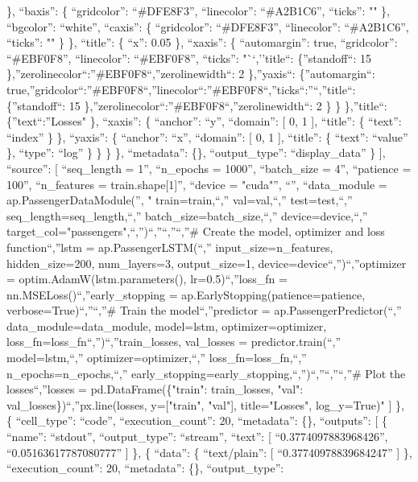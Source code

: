 \documentclass[
]{article}
\begin{document}
\}, ``baxis'': \{ ``gridcolor'': ``\#DFE8F3'', ``linecolor'':
``\#A2B1C6'', ``ticks'': "" \}, ``bgcolor'': ``white'', ``caxis'': \{
``gridcolor'': ``\#DFE8F3'', ``linecolor'': ``\#A2B1C6'', ``ticks'': ""
\} \}, ``title'': \{ ``x'': 0.05 \}, ``xaxis'': \{ ``automargin'': true,
``gridcolor'': ``\#EBF0F8'', ``linecolor'': ``\#EBF0F8'', ``ticks'':
"``,''title``: \{''standoff``: 15
\},''zerolinecolor``:''\#EBF0F8``,''zerolinewidth``: 2 \},''yaxis``:
\{''automargin``:
true,''gridcolor``:''\#EBF0F8``,''linecolor``:''\#EBF0F8``,''ticks``:''``,''title``:
\{''standoff``: 15 \},''zerolinecolor``:''\#EBF0F8``,''zerolinewidth``:
2 \} \} \},''title``: \{''text``:''Losses" \}, ``xaxis'': \{ ``anchor'':
``y'', ``domain'': {[} 0, 1 {]}, ``title'': \{ ``text'': ``index'' \}
\}, ``yaxis'': \{ ``anchor'': ``x'', ``domain'': {[} 0, 1 {]},
``title'': \{ ``text'': ``value'' \}, ``type'': ``log'' \} \} \} \},
``metadata'': \{\}, ``output\_type'': ``display\_data'' \} {]},
``source'': {[} ``seq\_length = 1\n'', ``n\_epochs = 1000\n'',
``batch\_size = 4\n'', ``patience = 100\n'', ``n\_features =
train.shape{[}1{]}\n'', ``device = "cuda"\n'', ``\n'', ``data\_module =
ap.PassengerDataModule(\n'', " train=train,\n``,'' val=val,\n``,''
test=test,\n``,'' seq\_length=seq\_length,\n``,''
batch\_size=batch\_size,\n``,'' device=device,\n``,''
target\_col="passengers",\n``,'')\n``,''\n``,''\n``,''\# Create the
model, optimizer and loss function\n``,''lstm = ap.PassengerLSTM(\n``,''
input\_size=n\_features, hidden\_size=200, num\_layers=3,
output\_size=1, device=device\n``,'')\n``,''optimizer =
optim.AdamW(lstm.parameters(), lr=0.5)\n``,''loss\_fn =
nn.MSELoss()\n``,''early\_stopping = ap.EarlyStopping(patience=patience,
verbose=True)\n``,''\n``,''\# Train the model\n``,''predictor =
ap.PassengerPredictor(\n``,'' data\_module=data\_module, model=lstm,
optimizer=optimizer, loss\_fn=loss\_fn\n``,'')\n``,''train\_losses,
val\_losses = predictor.train(\n``,'' model=lstm,\n``,''
optimizer=optimizer,\n``,'' loss\_fn=loss\_fn,\n``,''
n\_epochs=n\_epochs,\n``,''
early\_stopping=early\_stopping,\n``,'')\n``,''\n``,''\n``,''\# Plot the
losses\n``,''losses = pd.DataFrame(\{"train": train\_losses, "val":
val\_losses\})\n``,''px.line(losses, y={[}"train", "val"{]},
title="Losses", log\_y=True)\n" {]} \}, \{ ``cell\_type'': ``code'',
``execution\_count'': 20, ``metadata'': \{\}, ``outputs'': {[} \{
``name'': ``stdout'', ``output\_type'': ``stream'', ``text'': {[}
``0.3774097883968426\n'', ``0.05163617787080777\n'' {]} \}, \{ ``data'':
\{ ``text/plain'': {[} ``0.37740978839684247'' {]} \},
``execution\_count'': 20, ``metadata'': \{\}, ``output\_type'':
\end{document}
